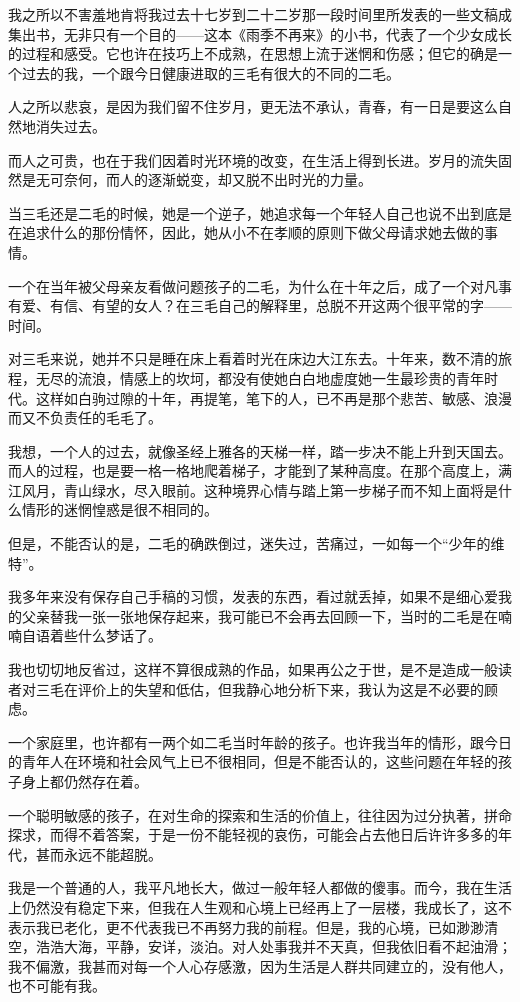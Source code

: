 \par 我之所以不害羞地肯将我过去十七岁到二十二岁那一段时间里所发表的一些文稿成集出书，无非只有一个目的——这本《雨季不再来》的小书，代表了一个少女成长的过程和感受。它也许在技巧上不成熟，在思想上流于迷惘和伤感；但它的确是一个过去的我，一个跟今日健康进取的三毛有很大的不同的二毛。
\par 人之所以悲哀，是因为我们留不住岁月，更无法不承认，青春，有一日是要这么自然地消失过去。
\par 而人之可贵，也在于我们因着时光环境的改变，在生活上得到长进。岁月的流失固然是无可奈何，而人的逐渐蜕变，却又脱不出时光的力量。
\par 当三毛还是二毛的时候，她是一个逆子，她追求每一个年轻人自己也说不出到底是在追求什么的那份情怀，因此，她从小不在孝顺的原则下做父母请求她去做的事情。
\par 一个在当年被父母亲友看做问题孩子的二毛，为什么在十年之后，成了一个对凡事有爱、有信、有望的女人？在三毛自己的解释里，总脱不开这两个很平常的字——时间。
\par 对三毛来说，她并不只是睡在床上看着时光在床边大江东去。十年来，数不清的旅程，无尽的流浪，情感上的坎坷，都没有使她白白地虚度她一生最珍贵的青年时代。这样如白驹过隙的十年，再提笔，笔下的人，已不再是那个悲苦、敏感、浪漫而又不负责任的毛毛了。
\par 我想，一个人的过去，就像圣经上雅各的天梯一样，踏一步决不能上升到天国去。而人的过程，也是要一格一格地爬着梯子，才能到了某种高度。在那个高度上，满江风月，青山绿水，尽入眼前。这种境界心情与踏上第一步梯子而不知上面将是什么情形的迷惘惶惑是很不相同的。
\par 但是，不能否认的是，二毛的确跌倒过，迷失过，苦痛过，一如每一个“少年的维特”。
\par 我多年来没有保存自己手稿的习惯，发表的东西，看过就丢掉，如果不是细心爱我的父亲替我一张一张地保存起来，我可能已不会再去回顾一下，当时的二毛是在喃喃自语着些什么梦话了。
\par 我也切切地反省过，这样不算很成熟的作品，如果再公之于世，是不是造成一般读者对三毛在评价上的失望和低估，但我静心地分析下来，我认为这是不必要的顾虑。
\par 一个家庭里，也许都有一两个如二毛当时年龄的孩子。也许我当年的情形，跟今日的青年人在环境和社会风气上已不很相同，但是不能否认的，这些问题在年轻的孩子身上都仍然存在着。
\par 一个聪明敏感的孩子，在对生命的探索和生活的价值上，往往因为过分执著，拼命探求，而得不着答案，于是一份不能轻视的哀伤，可能会占去他日后许许多多的年代，甚而永远不能超脱。
\par 我是一个普通的人，我平凡地长大，做过一般年轻人都做的傻事。而今，我在生活上仍然没有稳定下来，但我在人生观和心境上已经再上了一层楼，我成长了，这不表示我已老化，更不代表我已不再努力我的前程。但是，我的心境，已如渺渺清空，浩浩大海，平静，安详，淡泊。对人处事我并不天真，但我依旧看不起油滑；我不偏激，我甚而对每一个人心存感激，因为生活是人群共同建立的，没有他人，也不可能有我。
